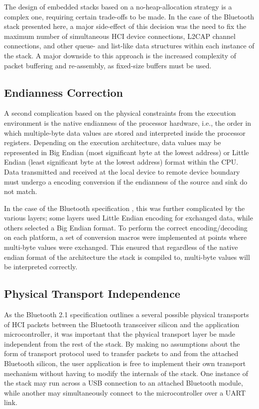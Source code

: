 The design of embedded stacks based on a no-heap-allocation strategy is a complex one, requiring certain trade-offs to be made. In the case of the Bluetooth stack presented here, a major side-effect of this decision was the need to fix the maximum number of simultaneous HCI device connections, L2CAP channel connections, and other queue- and list-like data structures within each instance of the stack. A major downside to this approach is the increased complexity of packet buffering and re-assembly, as fixed-size buffers must be used.

\FloatBarrier
\subsection{Endianness Correction}

A second complication based on the physical constraints from the execution environment is the native endianness of the processor hardware, i.e., the order in which multiple-byte data values are stored and interpreted inside the processor registers. Depending on the execution architecture, data values may be represented in Big Endian (most significant byte at the lowest address) or Little Endian (least significant byte at the lowest address) format within the CPU. Data transmitted and received at the local device to remote device boundary must undergo a encoding conversion if the endianness of the source and sink do not match.

In the case of the Bluetooth specification \cite{bt2p1specs}, this was further complicated by the various layers; some layers used Little Endian encoding for exchanged data, while others selected a Big Endian format. To perform the correct encoding/decoding on each platform, a set of conversion macros were implemented at points where multi-byte values were exchanged. This ensured that regardless of the native endian format of the architecture the stack is compiled to, multi-byte values will be interpreted correctly.

\FloatBarrier
\subsection{Physical Transport Independence}

As the Bluetooth 2.1 specification outlines a several possible physical transports \cite{bt2p1specs_transports} of HCI packets between the Bluetooth transceiver silicon and the application microcontroller, it was important that the physical transport layer be made independent from the rest of the stack. By making no assumptions about the form of transport protocol used to transfer packets to and from the attached Bluetooth silicon, the user application is free to implement their own transport mechanism without having to modify the internals of the stack. One instance of the stack may run across a USB connection to an attached Bluetooth module, while another may simultaneously connect to the microcontroller over a UART link.

